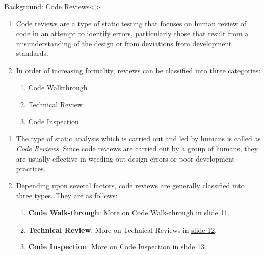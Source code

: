 \documentclass[12pt]{extarticle}
\newenvironment{instructionblock}{\Large\bgroup}{\egroup}
\newcommand{\ben}{\begin{enumerate}}
\newcommand{\een}{\end{enumerate}}
\begin{document}


\pagebreak
\begin{slide}{Background: Code Reviews}{\hyperref[slide 11]{\textless}\hyperref[slide 13]{\textgreater}}
	\vskip 10pt
	\begin{instructionblock}
	\begin{enumerate}
	\item Code reviews are a type of static testing that focuses on human review of code in an attempt to identify errors, particularly those that result from a misunderstanding of the design or from deviations from development standards.\cite{StaticTesting}
	\item In order of increasing formality, reviews can be classified into three categories:
	\ben
		\item Code Walkthrough 
		\item Technical Review
		\item Code Inspection
	\een
	\end{enumerate}	
	\end{instructionblock}
	
\begin{enumerate}
	\item The type of static analysis which is carried out and led by humans is called as \textit{Code Reviews}. Since code reviews are carried out by a group of humans, they are usually effective in weeding out design errors or poor development practices.
	
	\item Depending upon several factors, code reviews are generally classified into three types. They are as follows:
	\ben
		\item \textbf{Code Walk-through}: More on Code Walk-through in \underline{\hyperref[slide 11]{slide 11}}.
		\item \textbf{Technical Review}: More on Technical Reviews in \underline{\hyperref[slide 12]{slide 12}}.
		\item \textbf{Code Inspection}: More on Code Inspection in \underline{\hyperref[slide 13]{slide 13}}.  
	\een
	
\end{enumerate}
	
\end{slide}


\end{document}
